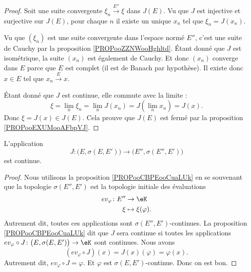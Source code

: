 \begin{proof}
	Soit une suite convergente \( \xi_n\stackrel{ E''}{\longrightarrow} \xi\) dans \( J(E)\). Vu que \( J\) est injective et surjective sur \( J(E)\), pour chaque \( n\) il existe un unique \( x_n\) tel que \( \xi_n=J(x_n)\).

	Vu que \( (\xi_n)\) est une suite convergente dans l'espace normé \( E''\), c'est une suite de Cauchy par la proposition \ref{PROPooZZNWooHghltd}. Étant donné que \( J\) est isométrique, la suite \( (x_n)\) est également de Cauchy. Et donc \( (x_n)\) converge dans \( E\) parce que \( E\) est complet (il est de Banach par hypothèse). Il existe donc \( x\in E\) tel que \( x_n\stackrel{ E}{\longrightarrow} x\).

	Étant donné que \( J\) est continue, elle commute avec la limite :
	\begin{equation}
		\xi=\lim_n\xi_n=\lim_nJ(x_n)=J(\lim_n x_n)=J(x).
	\end{equation}
	Donc \( \xi=J(x)\in J(E)\). Cela prouve que \( J(E)\) est fermé par la proposition \ref{PROPooEXUMooAFbpVJ}.
\end{proof}


\begin{proposition}	\label{PROPooJJINooXeUcQP}
	L'application
	\begin{equation}
		J \colon \big( E,\sigma(E,E') \big)\to \big( E'',\sigma(E'',E') \big)
	\end{equation}
	est continue.
\end{proposition}

\begin{proof}
	Nous utilisons la proposition \ref{PROPooCBPEooCuaLUk} en se souvenant que la topologie \( \sigma(E'',E')\) est la topologie initiale des évaluations
	\begin{equation}
		\begin{aligned}
			ev_{\varphi}\colon E'' & \to \eK               \\
			\xi                    & \mapsto \xi(\varphi).
		\end{aligned}
	\end{equation}
	Autrement dit, toutes ces applications sont \( \sigma(E'',E')\)-continues. La proposition \ref{PROPooCBPEooCuaLUk} dit que \( J\) sera continue si toutes les applications \(ev_{\varphi}\circ J \colon  \big( E,\sigma(E,E') \big) \to \eK  \) sont continues. Nous avons
	\begin{equation}
		(ev_{\varphi}\circ J)(x)=J(x)(\varphi)=\varphi(x).
	\end{equation}
	Autrement dit, \( ev_{\varphi}\circ J=\varphi\). Et \( \varphi\) est \( \sigma(E,E')\)-continue. Donc on est bon.
\end{proof}


